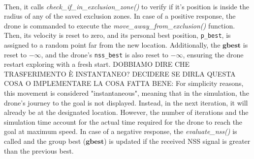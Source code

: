 \noindent\\
Then, it calls \textit{check\_if\_in\_exclusion\_zone()}
to verify if it's position is inside the radius of any of the 
saved exclusion zones.
In case of a positive response, the drone is commanded to 
execute the \textit{move\_away\_from\_exclusion()} function. 
Then, its velocity is reset to zero, and its personal 
best position, \texttt{p\_best}, is assigned to a random point 
far from the new location. Additionally, the $\mathbf{gbest}$ 
is reset to \(-\infty\), and the 
drone's \texttt{nss\_best} is also reset to \(-\infty\), 
ensuring the drone restart exploring with a fresh start.
DOBBIAMO DIRE CHE TRASFERIMENTO È INSTANTANEO?
DECIDERE SE DIRLA QUESTA COSA O IMPLEMENTARE LA COSA FATTA BENE:
For simplicity reasons, this movement is considered "instantaneous", 
meaning that in the simulation, the drone's journey to the goal is 
not displayed. Instead, in the next iteration, it will already 
be at the designated location. However, the number of 
iterations and the simulation time account for the actual 
time required for the drone to reach the goal at maximum speed.
In case of a negative response, the \textit{evaluate\_nss()} is 
called and the group best ($\mathbf{gbest}$) is updated if the received NSS signal 
is greater than the previous best.

